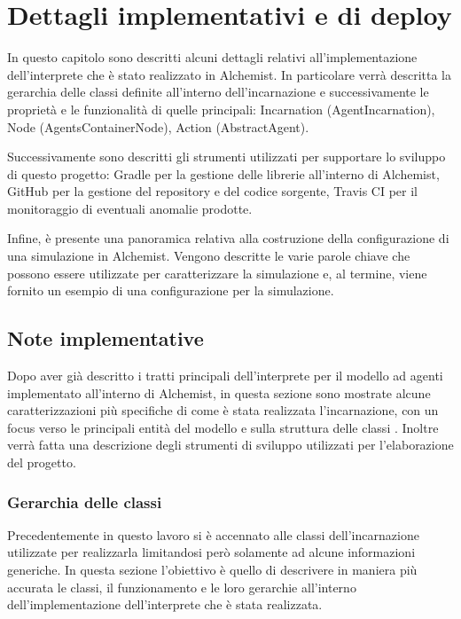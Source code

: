 \chapter{Dettagli implementativi e di deploy}
In questo capitolo sono descritti alcuni dettagli relativi all'implementazione dell'interprete che è stato realizzato in Alchemist. In particolare verrà descritta la gerarchia delle classi definite all'interno dell'incarnazione e successivamente le proprietà e le funzionalità di quelle principali: Incarnation (AgentIncarnation), Node (AgentsContainerNode), Action (AbstractAgent).

Successivamente sono descritti gli strumenti utilizzati per supportare lo sviluppo di questo progetto: Gradle per la gestione delle librerie all'interno di Alchemist, GitHub per la gestione del repository e del codice sorgente, Travis CI per il monitoraggio di eventuali anomalie prodotte.

Infine, è presente una panoramica relativa alla costruzione della configurazione di una simulazione in Alchemist. Vengono descritte le varie parole chiave che possono essere utilizzate per caratterizzare la simulazione e, al termine, viene fornito un esempio di una configurazione per la simulazione.

\section{Note implementative}
Dopo aver già descritto i tratti principali dell'interprete per il modello ad agenti implementato all'interno di Alchemist, in questa sezione sono mostrate alcune caratterizzazioni più specifiche di come è stata realizzata l'incarnazione, con un focus verso le principali entità del modello e sulla struttura delle classi .
Inoltre verrà fatta una descrizione degli strumenti di sviluppo utilizzati per l'elaborazione del progetto.

\subsection{Gerarchia delle classi}
Precedentemente in questo lavoro si è accennato alle classi dell'incarnazione utilizzate per realizzarla limitandosi però solamente ad alcune informazioni generiche. In questa sezione l'obiettivo è quello di descrivere in maniera più accurata le classi, il funzionamento e le loro gerarchie all'interno dell'implementazione dell'interprete che è stata realizzata.

